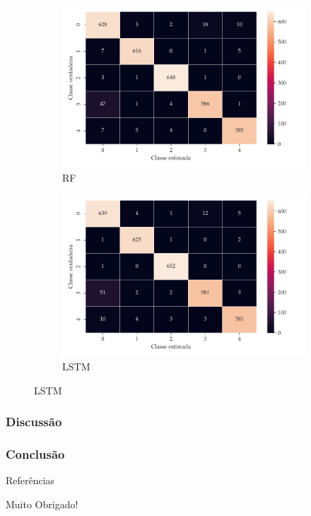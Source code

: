 \documentclass[aspectratio=169]{beamer}
\begin{document}
\begin{frame}
\begin{figure}[H]
\begin{subfigure}[H]{0.325\textwidth}
		\end{subfigure}
		\\
		\centering
		\begin{subfigure}[H]{0.325\textwidth}
			\centering
			\includegraphics[scale=0.25]{rf-confusion-matrix}
			\caption{RF}
		\end{subfigure}
		\centering
		\begin{subfigure}[H]{0.325\textwidth}
			\centering
			\includegraphics[scale=0.25]{lstm-confusion-matrix}
			\caption{LSTM}
		\end{subfigure}
		\centering
	\end{figure}		
	
\end{frame}

\begin{frame}
	\frametitle{Discussão}
	\justifying
\end{frame}

\begin{frame}
	\frametitle{Conclusão}
	\justifying
\end{frame}

\appendix

\begin{frame}{Referências}
    \tiny
    
    
\end{frame}

\begin{frame}[plain,c]
    \begin{center}
    \Huge Muito Obrigado!
    \end{center}
\end{frame}
\end{document}
